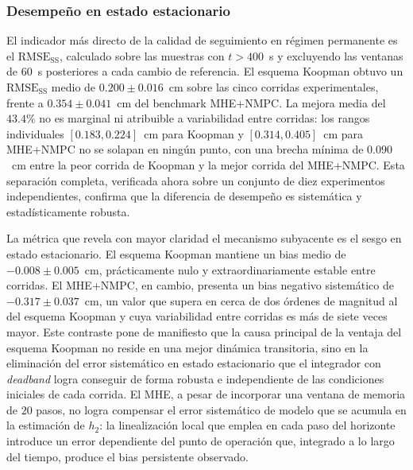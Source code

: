 \documentclass[12pt,letterpaper]{article}
\begin{document}
\subsubsection{Desempeño en estado estacionario}
\label{sec:analisis_exp_ss}

El indicador más directo de la calidad de seguimiento en régimen 
permanente es el $\mathrm{RMSE}_{\mathrm{SS}}$, calculado sobre 
las muestras con $t > 400$~s y excluyendo las ventanas de $60$~s 
posteriores a cada cambio de referencia. El esquema Koopman 
obtuvo un $\mathrm{RMSE}_{\mathrm{SS}}$ medio de $0.200 \pm 
0.016$~cm sobre las cinco corridas experimentales, frente a 
$0.354 \pm 0.041$~cm del benchmark MHE+NMPC. La mejora media del 
$43.4\%$ no es marginal ni atribuible a variabilidad entre 
corridas: los rangos individuales $[0.183, 0.224]$~cm para 
Koopman y $[0.314, 0.405]$~cm para MHE+NMPC no se solapan en 
ningún punto, con una brecha mínima de $0.090$~cm entre la peor 
corrida de Koopman y la mejor corrida del MHE+NMPC. Esta 
separación completa, verificada ahora sobre un conjunto de diez 
experimentos independientes, confirma que la diferencia de 
desempeño es sistemática y estadísticamente robusta.

La métrica que revela con mayor claridad el mecanismo subyacente 
es el sesgo en estado estacionario. El esquema Koopman mantiene 
un bias medio de $-0.008 \pm 0.005$~cm, prácticamente nulo y 
extraordinariamente estable entre corridas. El MHE+NMPC, en 
cambio, presenta un bias negativo sistemático de $-0.317 \pm 
0.037$~cm, un valor que supera en cerca de dos órdenes de 
magnitud al del esquema Koopman y cuya variabilidad entre 
corridas es más de siete veces mayor. Este contraste pone de 
manifiesto que la causa principal de la ventaja del esquema 
Koopman no reside en una mejor dinámica transitoria, sino en la 
eliminación del error sistemático en estado estacionario que el 
integrador con \textit{deadband} logra conseguir de forma 
robusta e independiente de las condiciones iniciales de cada 
corrida. El MHE, a pesar de incorporar una ventana de memoria de 
$20$ pasos, no logra compensar el error sistemático de modelo que 
se acumula en la estimación de $h_2$: la linealización local que 
emplea en cada paso del horizonte introduce un error dependiente 
del punto de operación que, integrado a lo largo del tiempo, 
produce el bias persistente observado.
\end{document}

